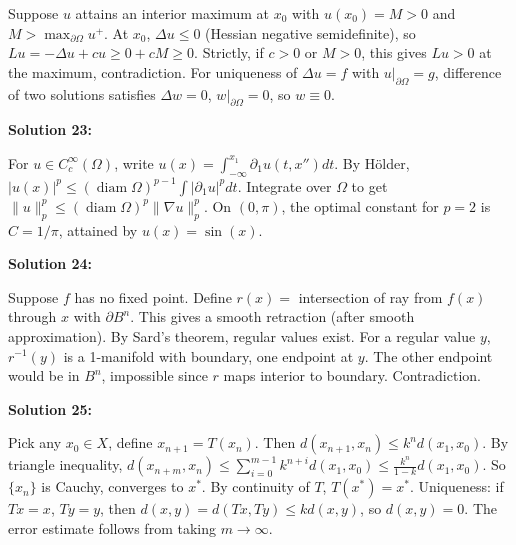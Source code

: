 \documentclass[12pt,a4paper]{exam}
\begin{document}
Suppose $u$ attains an interior maximum at $x_0$ with $u(x_0) = M > 0$ and $M > \max_{\partial\Omega} u^+$. At $x_0$, $\Delta u \leq 0$ (Hessian negative semidefinite), so $Lu = -\Delta u + c u \geq 0 + cM \geq 0$. Strictly, if $c>0$ or $M>0$, this gives $Lu > 0$ at the maximum, contradiction. For uniqueness of $\Delta u = f$ with $u|_{\partial\Omega} = g$, difference of two solutions satisfies $\Delta w = 0$, $w|_{\partial\Omega} = 0$, so $w \equiv 0$.

\vspace{0.5cm}

\textbf{Solution 23:}

For $u \in C_c^\infty(\Omega)$, write $u(x) = \int_{-\infty}^{x_1} \partial_1 u(t, x'') dt$. By H\"older, $|u(x)|^p \leq (\operatorname{diam}\Omega)^{p-1} \int |\partial_1 u|^p dt$. Integrate over $\Omega$ to get $\|u\|_p^p \leq (\operatorname{diam}\Omega)^p \|\nabla u\|_p^p$. On $(0,\pi)$, the optimal constant for $p=2$ is $C = 1/\pi$, attained by $u(x) = \sin(x)$.

\vspace{0.5cm}

\textbf{Solution 24:}

Suppose $f$ has no fixed point. Define $r(x) =$ intersection of ray from $f(x)$ through $x$ with $\partial B^n$. This gives a smooth retraction (after smooth approximation). By Sard's theorem, regular values exist. For a regular value $y$, $r^{-1}(y)$ is a 1-manifold with boundary, one endpoint at $y$. The other endpoint would be in $B^n$, impossible since $r$ maps interior to boundary. Contradiction.

\vspace{0.5cm}

\textbf{Solution 25:}

Pick any $x_0 \in X$, define $x_{n+1} = T(x_n)$. Then $d(x_{n+1}, x_n) \leq k^n d(x_1, x_0)$. By triangle inequality, $d(x_{n+m}, x_n) \leq \sum_{i=0}^{m-1} k^{n+i} d(x_1, x_0) \leq \frac{k^n}{1-k} d(x_1, x_0)$. So $\{x_n\}$ is Cauchy, converges to $x^*$. By continuity of $T$, $T(x^*) = x^*$. Uniqueness: if $Tx=x$, $Ty=y$, then $d(x,y) = d(Tx,Ty) \leq k d(x,y)$, so $d(x,y)=0$. The error estimate follows from taking $m \to \infty$.

\vspace{0.5cm}
\end{document}
